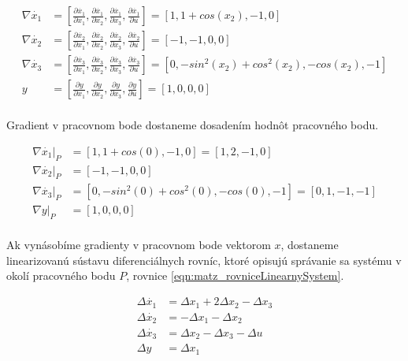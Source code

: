 \documentclass[../main.tex]{subfiles}
\begin{document}
\begin{equation}
		\begin{aligned}
		\nabla{\dot{x_1}} &= [\frac{\partial{\dot{x_1}}}{\partial{x_1}},\frac{\partial{\dot{x_1}}}{\partial{x_2}},\frac{\partial{\dot{x_1}}}{\partial{x_3}},\frac{\partial{\dot{x_1}}}{\partial{u}}] = [1, 1 + cos(x_2), -1, 0]			\\
		\nabla{\dot{x_2}} &= [\frac{\partial{\dot{x_2}}}{\partial{x_1}},\frac{\partial{\dot{x_2}}}{\partial{x_2}},\frac{\partial{\dot{x_2}}}{\partial{x_3}},\frac{\partial{\dot{x_2}}}{\partial{u}}] = [-1, -1, 0, 0]			\\
		\nabla{\dot{x_3}} &= [\frac{\partial{\dot{x_3}}}{\partial{x_1}},\frac{\partial{\dot{x_3}}}{\partial{x_2}},\frac{\partial{\dot{x_3}}}{\partial{x_3}},\frac{\partial{\dot{x_3}}}{\partial{u}}] = [0, -sin^2(x_2)+cos^2(x_2), -cos(x_2), -1]			\\
		y &= [\frac{\partial{y}}{\partial{x_1}},\frac{\partial{y}}{\partial{x_2}},\frac{\partial{y}}{\partial{x_3}},\frac{\partial{y}}{\partial{u}}] = [1, 0, 0, 0]			\\
		\end{aligned}
		\label{eqn:matz_rovniceSystemuGradient}
\end{equation}

Gradient v pracovnom bode dostaneme dosadením hodnôt pracovného bodu.

\begin{equation}
		\begin{aligned}
		\nabla{\dot{x_1}}|_{P} &= [1, 1 + cos(0), -1, 0] = [1, 2, -1, 0]			\\
		\nabla{\dot{x_2}}|_{P} &= [-1, -1, 0, 0] \\
		\nabla{\dot{x_3}}|_{P} &= [0, -sin^2(0)+cos^2(0), -cos(0), -1] = [0,1, -1, -1]			\\
		\nabla{y}|_{P} &= [1, 0, 0, 0]			\\
		\end{aligned}
		\label{eqn:matz_rovniceSystemuGradient}
\end{equation}

Ak vynásobíme gradienty v pracovnom bode vektorom $x$, dostaneme linearizovanú sústavu diferenciálnych rovníc, ktoré opisujú správanie sa systému v okolí pracovného bodu $P$, rovnice \ref{eqn:matz_rovniceLinearnySystem}.

\begin{equation}
		\begin{aligned}
		\Delta{\dot{x_1}} &= \Delta{x_1} + 2\Delta{x_2} - \Delta{x_3}			\\
		\Delta{\dot{x_2}} &= -\Delta{x_1} - \Delta{x_2} \\
		\Delta{\dot{x_3}} &= \Delta{x_2} - \Delta{x_3} - \Delta{u}		\\
		\Delta{y} &= \Delta{x_1}			\\
		\end{aligned}
		\label{eqn:matz_rovniceLinearnySystem}
\end{equation}
\end{document}
